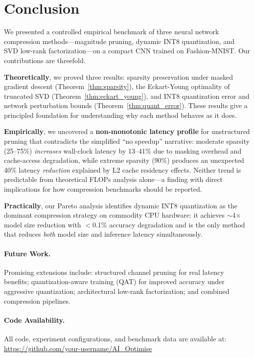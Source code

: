 \section{Conclusion}
\label{sec:conclusion}

We presented a controlled empirical benchmark of three neural network
compression methods—magnitude pruning, dynamic INT8 quantization, and
SVD low-rank factorization—on a compact CNN trained on Fashion-MNIST.
Our contributions are threefold.

\textbf{Theoretically}, we proved three results:
sparsity preservation under masked gradient descent (Theorem~\ref{thm:sparsity}),
the Eckart-Young optimality of truncated SVD (Theorem~\ref{thm:eckart_young}),
and INT8 quantization error and network perturbation bounds (Theorem~\ref{thm:quant_error}).
These results give a principled foundation for understanding why each
method behaves as it does.

\textbf{Empirically}, we uncovered a \textbf{non-monotonic latency profile}
for unstructured pruning that contradicts the simplified ``no speedup'' narrative:
moderate sparsity (25--75\%) \emph{increases} wall-clock latency by 13--41\%
due to masking overhead and cache-access degradation, while extreme sparsity
(90\%) produces an unexpected 40\% latency \emph{reduction} explained by
L2 cache residency effects. Neither trend is predictable from theoretical
FLOPs analysis alone—a finding with direct implications for how compression
benchmarks should be reported.

\textbf{Practically}, our Pareto analysis identifies dynamic INT8
quantization as the dominant compression strategy on commodity CPU
hardware: it achieves $\sim$4$\times$ model size reduction with
$<$0.1\% accuracy degradation and is the only method that reduces
\emph{both} model size and inference latency simultaneously.

\paragraph{Future Work.}
Promising extensions include:
structured channel pruning for real latency benefits;
quantization-aware training (QAT) for improved accuracy under
aggressive quantization;
architectural low-rank factorization;
and combined compression pipelines.

\paragraph{Code Availability.}
All code, experiment configurations, and benchmark data are available at:
\url{https://github.com/your-username/AI_Optimise}
